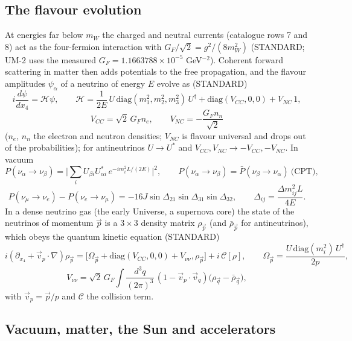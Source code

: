 \documentclass[
  10pt,
]{article}
\begin{document}
\hypertarget{the-flavour-evolution}{%
\subsection{The flavour evolution}\label{the-flavour-evolution}}

At energies far below \(m_W\) the charged and neutral currents
(catalogue rows 7 and 8) act as the four-fermion interaction with
\(G_F/\sqrt2 = g^2/(8m_W^2)\) (STANDARD; UM-2 uses the measured
\(G_F = 1.1663788\times10^{-5}\) GeV\(^{-2}\)). Coherent forward
scattering in matter then adds potentials to the free propagation, and
the flavour amplitudes \(\psi_\alpha\) of a neutrino of energy \(E\)
evolve as (STANDARD)
\[ i\frac{d\psi}{dx_4} = \mathcal H\psi,\qquad \mathcal H = \frac{1}{2E}\,U\,\mathrm{diag}(m_1^2, m_2^2, m_3^2)\,U^\dagger + \mathrm{diag}(V_{CC}, 0, 0) + V_{NC}\,1, \]
\[ V_{CC} = \sqrt2\,G_Fn_e,\qquad V_{NC} = -\frac{G_Fn_n}{\sqrt2} \]
(\(n_e\), \(n_n\) the electron and neutron densities; \(V_{NC}\) is
flavour universal and drops out of the probabilities); for antineutrinos
\(U \to U^*\) and \(V_{CC}, V_{NC} \to -V_{CC}, -V_{NC}\). In vacuum
\[ P(\nu_\alpha\to\nu_\beta) = \Big\lvert\sum_iU_{\beta i}U^*_{\alpha i}\,e^{-im_i^2L/(2E)}\Big\rvert^2,\qquad P(\nu_\alpha\to\nu_\beta) = \bar P(\nu_\beta\to\nu_\alpha)\ \text{(CPT)},\]
\[ P(\nu_\mu\to\nu_e) - P(\nu_e\to\nu_\mu) = -16J\sin\Delta_{21}\sin\Delta_{31}\sin\Delta_{32},\qquad \Delta_{ij} = \frac{\Delta m^2_{ij}L}{4E}. \]
In a dense neutrino gas (the early Universe, a supernova core) the state
of the neutrinos of momentum \(\vec p\) is a \(3\times3\) density matrix
\(\rho_{\vec p}\) (and \(\bar\rho_{\vec p}\) for antineutrinos), which
obeys the quantum kinetic equation (STANDARD)
\[ i(\partial_{x_4} + \vec v_p\cdot\nabla)\rho_{\vec p} = \big[\Omega_{\vec p} + \mathrm{diag}(V_{CC}, 0, 0) + V_{\nu\nu}, \rho_{\vec p}\big] + i\,\mathcal C[\rho],\qquad
   \Omega_{\vec p} = \frac{U\,\mathrm{diag}(m_i^2)\,U^\dagger}{2p}, \]
\[ V_{\nu\nu} = \sqrt2\,G_F\int\frac{d^3q}{(2\pi)^3}\,(1 - \vec v_p\cdot\vec v_q)\big(\rho_{\vec q} - \bar\rho_{\vec q}\big), \]
with \(\vec v_p = \vec p/p\) and \(\mathcal C\) the collision term.

\hypertarget{vacuum-matter-the-sun-and-accelerators}{%
\subsection{Vacuum, matter, the Sun and
accelerators}\label{vacuum-matter-the-sun-and-accelerators}}
\end{document}
